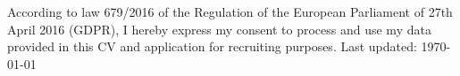 \documentclass[10pt,a4paper,ragged2e,withhyper]{cv}
\begin{document}

\makecvheader



\begin{paracol}{1}       

    

    
        
    
	
    
	
    

\end{paracol}

\vfill

\begin{center}
    \small According to law 679/2016 of the Regulation of the European Parliament of 27th April 2016 (GDPR), I hereby express my consent to process and use my data provided in this CV and application for recruiting purposes. Last updated: \today
\end{center}
\end{document}
